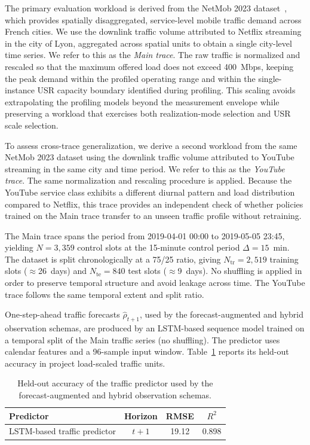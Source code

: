 \documentclass[a4paper,fleqn]{cas-sc}
\begin{document}
The primary evaluation workload is derived from the NetMob 2023 dataset~\cite{netmob2023}, which provides spatially disaggregated, service-level mobile traffic demand across French cities. We use the downlink traffic volume attributed to Netflix streaming in the city of Lyon, aggregated across spatial units to obtain a single city-level time series. We refer to this as the \emph{Main trace}. The raw traffic is normalized and rescaled so that the maximum offered load does not exceed 400~Mbps, keeping the peak demand within the profiled operating range and within the single-instance USR capacity boundary identified during profiling. This scaling avoids extrapolating the profiling models beyond the measurement envelope while preserving a workload that exercises both realization-mode selection and USR scale selection.

To assess cross-trace generalization, we derive a second workload from the same NetMob 2023 dataset using the downlink traffic volume attributed to YouTube streaming in the same city and time period. We refer to this as the \emph{YouTube trace}. The same normalization and rescaling procedure is applied. Because the YouTube service class exhibits a different diurnal pattern and load distribution compared to Netflix, this trace provides an independent check of whether policies trained on the Main trace transfer to an unseen traffic profile without retraining.

The Main trace spans the period from 2019-04-01 00:00 to 2019-05-05 23:45, yielding $N=3{,}359$ control slots at the 15-minute control period $\Delta=15$~min. The dataset is split chronologically at a 75/25 ratio, giving $N_{\mathrm{tr}}=2{,}519$ training slots ($\approx$26~days) and $N_{\mathrm{te}}=840$ test slots ($\approx$9~days). No shuffling is applied in order to preserve temporal structure and avoid leakage across time. The YouTube trace follows the same temporal extent and split ratio.

One-step-ahead traffic forecasts $\hat{\rho}_{t+1}$, used by the forecast-augmented and hybrid observation schemas, are produced by an LSTM-based sequence model trained on a temporal split of the Main traffic series (no shuffling). The predictor uses calendar features and a 96-sample input window. Table~\ref{tab:forecast_acc} reports its held-out accuracy in project load-scaled traffic units.

\begin{table}[width=.9\linewidth,cols=4,pos=h]
\centering
\caption{Held-out accuracy of the traffic predictor used by the forecast-augmented and hybrid observation schemas.}
\label{tab:forecast_acc}
\begin{tabular}{l c c c}
\hline
Predictor & Horizon & RMSE & $R^2$ \\
\hline
LSTM-based traffic predictor  & \(t{+}1\) & 19.12 & 0.898 \\
\hline
\end{tabular}
\end{table}
\end{document}
